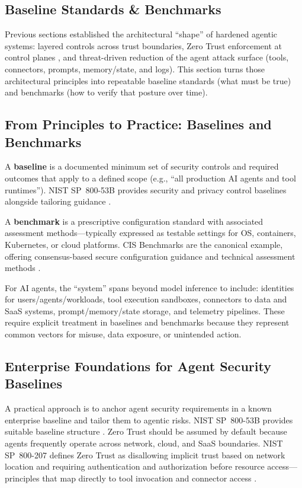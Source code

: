 \begin{TNtwocol}
      \section{Baseline Standards \& Benchmarks}

      Previous sections established the architectural “shape” of hardened agentic systems: layered controls across trust boundaries, Zero Trust enforcement at control planes \cite{NIST_SP800_207}, and threat-driven reduction of the agent attack surface (tools, connectors, prompts, memory/state, and logs). This section turns those architectural principles into repeatable baseline standards (what must be true) and benchmarks (how to verify that posture over time).

      \subsection{From Principles to Practice: Baselines and Benchmarks}

      A \textbf{baseline} is a documented minimum set of security controls and required outcomes that apply to a defined scope (e.g., “all production AI agents and tool runtimes”). NIST SP~800-53B provides security and privacy control baselines alongside tailoring guidance \cite{NIST_SP800_53B}.

      A \textbf{benchmark} is a prescriptive configuration standard with associated assessment methods—typically expressed as testable settings for OS, containers, Kubernetes, or cloud platforms. CIS Benchmarks are the canonical example, offering consensus-based secure configuration guidance and technical assessment methods \cite{CIS_Benchmarks}.

      For AI agents, the “system” spans beyond model inference to include: identities for users/agents/workloads, tool execution sandboxes, connectors to data and SaaS systems, prompt/memory/state storage, and telemetry pipelines. These require explicit treatment in baselines and benchmarks because they represent common vectors for misuse, data exposure, or unintended action.

      \subsection{Enterprise Foundations for Agent Security Baselines}

      A practical approach is to anchor agent security requirements in a known enterprise baseline and tailor them to agentic risks. NIST SP~800-53B provides suitable baseline structure \cite{NIST_SP800_53B}. Zero Trust should be assumed by default because agents frequently operate across network, cloud, and SaaS boundaries. NIST SP~800-207 defines Zero Trust as disallowing implicit trust based on network location and requiring authentication and authorization before resource access—principles that map directly to tool invocation and connector access \cite{NIST_SP800_207}.


\end{TNtwocol}
